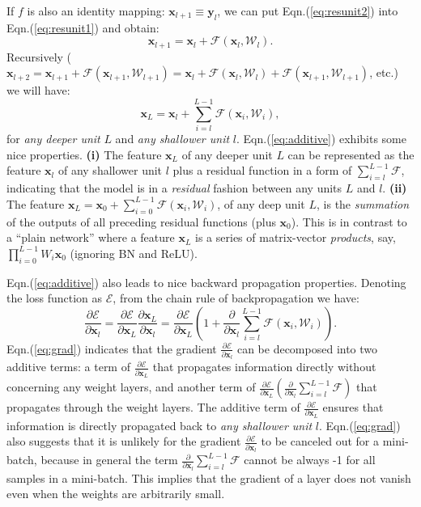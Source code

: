 \documentclass[runningheads]{llncs}
\newcommand{\ve}[1]{\mathbf{#1}} %
\newcommand{\fp}[2]{\frac{\partial{#1}}{\partial{#2}}} %
\newcommand{\dvp}[2]{\frac{\partial}{\partial{#2}}#1} %
\begin{document}
If $f$ is also an identity mapping: $\ve{x}_{l+1} \equiv \ve{y}_{l}$, we can put Eqn.(\ref{eq:resunit2}) into Eqn.(\ref{eq:resunit1}) and obtain:
\begin{equation}
\ve{x}_{l+1} = \ve{x}_{l} + \mathcal{F}(\ve{x}_{l}, \mathcal{W}_{l}). \label{eq:additive0}
\end{equation}
Recursively ({\fontsize{8pt}{1em}$\ve{x}_{l+2} = \ve{x}_{l+1} + \mathcal{F}(\ve{x}_{l+1},\mathcal{W}_{l+1})=\ve{x}_{l} + \mathcal{F}(\ve{x}_{l}, \mathcal{W}_{l})+\mathcal{F}(\ve{x}_{l+1}, \mathcal{W}_{l+1})$}, etc.) we will have:
\begin{equation}
\ve{x}_{L} = \ve{x}_{l} + \sum_{i=l}^{L-1}\mathcal{F}(\ve{x}_{i}, \mathcal{W}_{i}), \label{eq:additive}
\end{equation}
for \emph{any deeper unit} $L$ and \emph{any shallower unit} $l$. Eqn.(\ref{eq:additive}) exhibits some nice properties. \textbf{(i)} The feature $\ve{x}_L$ of any deeper unit $L$ can be represented as the feature $\ve{x}_l$ of any shallower unit $l$ plus a residual function in a form of $\sum_{i=l}^{L-1}\mathcal{F}$, indicating that the model is in a \emph{residual} fashion between any units $L$ and $l$. \textbf{(ii)} The feature $\ve{x}_{L} = \ve{x}_{0} + \sum_{i=0}^{L-1}\mathcal{F}(\ve{x}_{i}, \mathcal{W}_{i})$, of any deep unit $L$,  is the \emph{summation} of the outputs of all preceding residual functions (plus $\ve{x}_{0}$). This is in contrast to a ``plain network'' where a feature $\ve{x}_{L}$ is a series of matrix-vector \emph{products}, say, $\prod_{i=0}^{L-1}W_{i}\ve{x}_0$ (ignoring BN and ReLU).

Eqn.(\ref{eq:additive}) also leads to nice backward propagation properties.
Denoting the loss function as $\mathcal{E}$, from the chain rule of backpropagation \cite{LeCun1989} we have:
\begin{equation}
\fp{\mathcal{E}}{\ve{x}_{l}}=\fp{\mathcal{E}}{\ve{x}_{L}}\fp{\ve{x}_{L}}{\ve{x}_{l}}=\fp{\mathcal{E}}{\ve{x}_{L}}\left(1+\dvp{\sum_{i=l}^{L-1}\mathcal{F}(\ve{x}_{i}, \mathcal{W}_{i})}{\ve{x}_{l}}\right).\label{eq:grad}
\end{equation}
Eqn.(\ref{eq:grad}) indicates that the gradient $\fp{\mathcal{E}}{\ve{x}_{l}}$ can be decomposed into two additive terms: a term of $\fp{\mathcal{E}}{\ve{x}_{L}}$ that propagates information directly without concerning any weight layers, and another term of {\fontsize{8pt}{1em}\selectfont $\fp{\mathcal{E}}{\ve{x}_{L}}\left(\dvp{\sum_{i=l}^{L-1}\mathcal{F}}{\ve{x}_{l}}\right)$} that propagates through the weight layers. The additive term of $\fp{\mathcal{E}}{\ve{x}_{L}}$ ensures that information is directly propagated back to \emph{any shallower unit} $l$.
Eqn.(\ref{eq:grad}) also suggests that it is unlikely for the gradient $\fp{\mathcal{E}}{\ve{x}_{l}}$ to be canceled out for a mini-batch, because in general the term {\fontsize{8pt}{1em}\selectfont $\dvp{\sum_{i=l}^{L-1}\mathcal{F}}{\ve{x}_{l}}$} cannot be always -1 for all samples in a mini-batch. This implies that the gradient of a layer does not vanish even when the weights are arbitrarily small.
\end{document}
